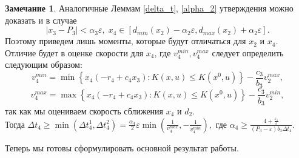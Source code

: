 \documentclass[11pt]{article}
\theoremstyle{definition}
\newtheorem{Remark_l}{Замечание}[lemma]
\newcommand\Set[2]{\left\{ #1 \colon #2 \right\}}
\begin{document}
\begin{Remark_l} 
\label{rem_2}
Аналогичные Леммам \ref{delta_t}, \ref{alpha_2} утверждения можно доказать и в случае 
$$|x_3 - P_3| < \alpha_3\varepsilon, \; x_4 \in [d_{min}(x_2) - \alpha_2\varepsilon, d_{max}(x_2) + \alpha_2\varepsilon].$$ Поэтому приведем лишь моменты, которые будут отличаться для $x_2$ и $x_4.$
Отличие будет в оценке скорости для $x_4$, где $v_4^{min}, v_4^{max}$ следует определить следующим образом: 
$$v_4^{min} = \min\Set{x_4(-r_4 + c_4x_3)}{K(x,u) \leqslant K(x^0,u)} - \frac{c_3}{b_3}v_2^{max},$$
$$v_4^{max} = \max\Set{x_4(-r_4 + c_4x_3)}{K(x,u) \leqslant K(x^0,u)} - \frac{c_3}{b_3}v_2^{min},$$
так как мы оцениваем скорость сближения $x_4$ и $d_2.$ \\
Тогда $\Delta t_4 \geqslant \min(\Delta t^1_4, \Delta t^2_4) = \frac{\alpha_4}{2}\varepsilon\min(\frac{1}{v_4^{max}}, -\frac{1}{v_4^{min}}),$ где $\alpha_4 \geqslant \frac{4 + \frac{\varepsilon_1}{\varepsilon}}{(P_3 - \varepsilon)b_3\Delta t_4}.$
\end{Remark_l}

Теперь мы готовы сформулировать основной результат работы.
\end{document}
